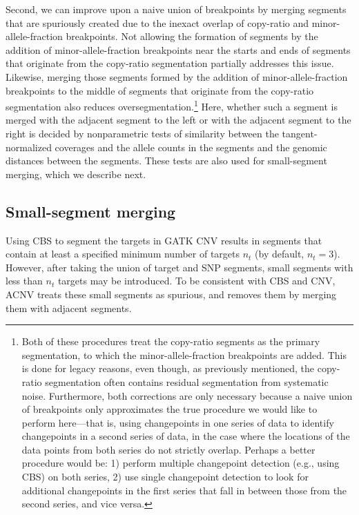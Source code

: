\documentclass[nofootinbib,amssymb,amsmath]{revtex4}
\begin{document}
Second, we can improve upon a naive union of breakpoints by merging segments that are spuriously created due to the inexact overlap of copy-ratio and minor-allele-fraction breakpoints.  Not allowing the formation of segments by the addition of minor-allele-fraction breakpoints near the starts and ends of segments that originate from the copy-ratio segmentation partially addresses this issue.  Likewise, merging those segments formed by the addition of minor-allele-fraction breakpoints to the middle of segments that originate from the copy-ratio segmentation also reduces oversegmentation.\footnote{Both of these procedures treat the copy-ratio segments as the primary segmentation, to which the minor-allele-fraction breakpoints are added.  This is done for legacy reasons, even though, as previously mentioned, the copy-ratio segmentation often contains residual segmentation from systematic noise.  Furthermore, both corrections are only necessary because a naive union of breakpoints only approximates the true procedure we would like to perform here---that is, using changepoints in one series of data to identify changepoints in a second series of data, in the case where the locations of the data points from both series do not strictly overlap.  Perhaps a better procedure would be: 1) perform multiple changepoint detection (e.g., using CBS) on both series, 2) use single changepoint detection to look for additional changepoints in the first series that fall in between those from the second series, and vice versa.}  Here, whether such a segment is merged with the adjacent segment to the left or with the adjacent segment to the right is decided by nonparametric tests of similarity between the tangent-normalized coverages and the allele counts in the segments and the genomic distances between the segments.  These tests are also used for small-segment merging, which we describe next.


\subsection{Small-segment merging} \label{small-segment-merging}

Using CBS to segment the targets in GATK CNV results in segments that contain at least a specified minimum number of targets $n_t$ (by default, $n_t = 3$).  However, after taking the union of target and SNP segments, small segments with less than $n_t$ targets may be introduced.  To be consistent with CBS and CNV, ACNV treats these small segments as spurious, and removes them by merging them with adjacent segments.
\end{document}
